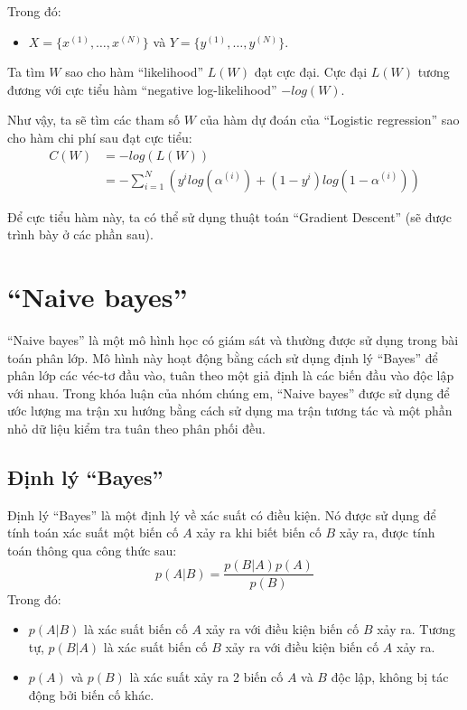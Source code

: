 Trong đó:
\begin{itemize}
    \item $X = \{x^{(1)}, \dots, x^{(N)} \}$ và $Y = \{y^{(1)}, \dots, y^{(N)} \}$.
\end{itemize}

Ta tìm $W$ sao cho hàm ``likelihood'' $L(W)$ đạt cực đại. Cực đại $L(W)$ tương đương với cực tiểu hàm ``negative log-likelihood'' $-log(W)$.

Như vậy, ta sẽ tìm các tham số $W$ của hàm dự đoán của ``Logistic regression'' sao cho hàm chi phí sau đạt cực tiểu:
\begin{equation}\label{eq:2.2_C}
    \begin{split}
        C(W) &= -log(L(W))\\
        &= - \sum_{i=1}^{N} (y^{i} log(\alpha^{(i)}) + (1-y^{i})log(1-\alpha^{(i)}))
    \end{split}
\end{equation}


Để cực tiểu hàm này, ta có thể sử dụng thuật toán ``Gradient Descent'' (sẽ được trình bày ở các phần sau).
\section{``Naive bayes''}
``Naive bayes'' là một mô hình học có giám sát và thường được sử dụng trong bài toán phân lớp. Mô hình này hoạt động bằng cách sử dụng định lý ``Bayes'' để phân lớp các véc-tơ đầu vào, tuân theo một giả định là các biến đầu vào độc lập với nhau. Trong khóa luận của nhóm chúng em, ``Naive bayes'' được sử dụng để ước lượng ma trận xu hướng bằng cách sử dụng ma trận tương tác và một phần nhỏ dữ liệu kiểm tra tuân theo phân phối đều.
\subsection{Định lý ``Bayes''}
Định lý ``Bayes'' là một định lý về xác suất có điều kiện. Nó được sử dụng để tính toán xác suất một biến cố $A$ xảy ra khi biết biến cố $B$ xảy ra, được tính toán thông qua công thức sau:
\begin{equation}
    p(A|B) = \frac{p(B|A)p(A)}{p(B)}
    \label{eq:2.3_bayes}
\end{equation}
Trong đó:
\begin{itemize}
    \item $p(A|B)$ là xác suất biến cố $A$ xảy ra với điều kiện biến cố $B$ xảy ra. Tương tự, $p(B|A)$ là xác suất biến cố $B$ xảy ra với điều kiện biến cố $A$ xảy ra.
    \item $p(A)$ và $p(B)$ là xác suất xảy ra 2 biến cố $A$ và $B$ độc lập, không bị tác động bởi biến cố khác.
\end{itemize}
